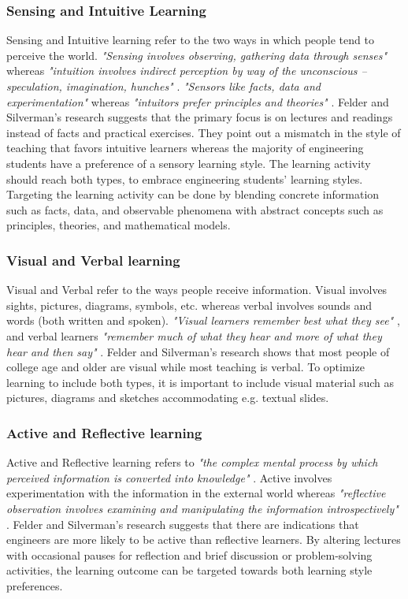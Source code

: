 \subsubsection*{Sensing and Intuitive Learning}
Sensing and Intuitive learning refer to the two ways in which people tend to perceive the world. \textit{"Sensing involves observing, gathering data through senses"}  \cite[p. 676]{Felder88k.:learning} whereas \textit{"intuition involves indirect perception by way of the unconscious -- speculation, imagination, hunches"} \cite[p. 676]{Felder88k.:learning}. \textit{"Sensors like facts, data and experimentation"} \cite[p. 676]{Felder88k.:learning} whereas \textit{"intuitors prefer principles and theories"} \cite[p. 676]{Felder88k.:learning}. Felder and Silverman's research suggests that
the primary focus is on lectures and readings instead of facts and practical exercises. They point out a mismatch in the style of teaching that favors intuitive learners whereas the majority of engineering students have a preference of a sensory learning style. The learning activity should reach both types, to embrace engineering students' learning styles. Targeting the learning activity can be done by blending concrete information such as facts, data, and observable phenomena with abstract concepts such as principles, theories, and mathematical models. 

\subsubsection*{Visual and Verbal learning}
Visual and Verbal refer to the ways people receive information. Visual involves sights, pictures, diagrams, symbols, etc. whereas verbal involves sounds and words (both written and spoken). \textit{"Visual learners remember best what they see"} \cite[p. 676]{Felder88k.:learning}, and verbal learners \textit{"remember much of what they hear and more of what they hear and then say"} \cite[p. 676]{Felder88k.:learning}. Felder and Silverman's research shows that most people of college age and older are visual while most teaching is verbal. To optimize learning to include both types, it is important to include visual material such as pictures, diagrams and sketches accommodating e.g. textual slides.

\subsubsection*{Active and Reflective learning}
Active and Reflective learning refers to \textit{"the complex mental process by which perceived information is converted into knowledge" }\cite[p. 678]{Felder88k.:learning}. Active involves experimentation with the information in the external world whereas \textit{"reflective observation involves examining and manipulating the information introspectively"} \cite[p. 678]{Felder88k.:learning}. Felder and Silverman's research suggests that there are indications that engineers are more likely to be active than reflective learners. By altering lectures with occasional pauses for reflection and brief discussion or problem-solving activities, the learning outcome can be targeted towards both learning style preferences.

